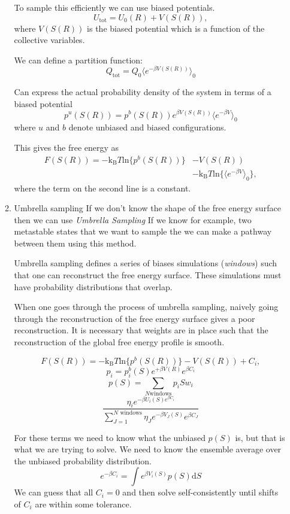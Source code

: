 \documentclass[11pt]{article}
\begin{document}
\begin{enumerate}
\begin{enumerate}
To sample this efficiently we can use biased potentials. 
\[ U_{\text{tot}} = U_{0}(R) + V( S(R) ),  \]
where \(V(S(R))\) is the biased potential which is a function of the collective variables. 

We can define a partition function:
\[ Q_{\text{tot}} = Q_{0}\big\langle e^{-\beta V(S(R))}\big\rangle_{0}  \]

Can express the actual probability density of the system in terms of a biased potential 
\[ p^{u}(S(R)) = p^{b}(S(R)) e^{ \beta V(S(R)) } \big\langle e^{-\beta V}\big\rangle_{0} \]
where \(u\) and \(b\) denote unbiased and biased configurations.  

This gives the free energy as
\begin{align}
F( S(R) )  =  - \text{k}_{\text{B}} T \text{ln} \big\{  p^{b}(S(R)) \big\} &- V(S(R)) \\
             &- \text{k}_{\text{B}} T \text{ln} \big\{ \big\langle e^{-\beta V}\big\rangle_{0} \}, 
\end{align}
where the term on the second line is a constant. 

\item Umbrella sampling
\label{sec:orge41f334}
If we don't know the shape of the free energy surface then we can use \emph{Umbrella Sampling}
If we know for example, two metastable states that we want to sample the we can make a pathway between them using this method.

Umbrella sampling defines a series of biases simulations (\emph{windows}) such that one can reconstruct the free energy surface. 
These simulations must have probability distributions that overlap. 

When one goes through the process of umbrella sampling, naively going through the reconstruction of the free energy surface
gives a poor reconstruction. It is necessary that weights are in place such that the reconstruction of the global free energy
profile is smooth. 

\[  F( S(R) )  =  - \text{k}_{\text{B}} T \text{ln} \big\{  p^{b}(S(R))
     \big\} - V(S(R)) + C_{i} , \] 
\[ p_{i} = p^{b}_{i}(S) e^{ +\beta V(R) }e^{\beta C_{i}} \]
\[ p(S) = \sum_{N \text{windows}} p_i{S} w_{i} \]
\[ \frac{ \eta_{i} e^{ -\beta U_{i}(S) e^{\beta C_{i}}  }  }{ \sum^{ N
     \text{ windows}}_{J=1} \eta_{J} e^{ -\beta V_{J}(S) } e^{ \beta C_{J} }} \]


For these terms we need to know what the unbiased \(p(S)\) is, but that is what we are trying to solve. 
We need to know the ensemble average over the unbiased probability distribution. 
\[ e^{-\beta C_{i}} = \int e^{ \beta V_{i}(S) } p(S) \text{d}S \]
We can guess that all \(C_{i} = 0\) and then solve self-consistently until shifts of \(C_i\) are within some tolerance. 


\end{enumerate}
\end{enumerate}
\end{document}
